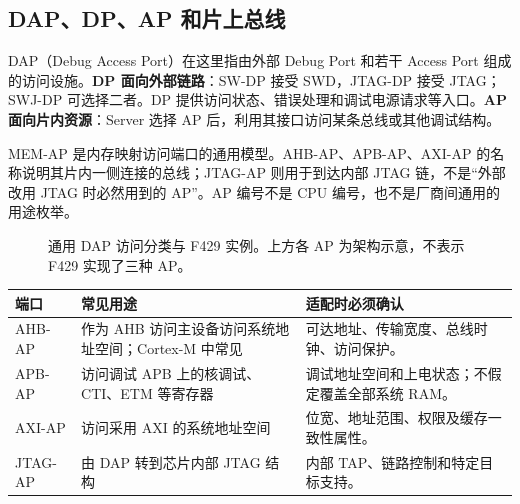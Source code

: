\documentclass[UTF8,a4paper,11pt,oneside,fontset=none]{ctexart}
\begin{document}
\subsection{DAP、DP、AP 和片上总线}
DAP（Debug Access Port）在这里指由外部 Debug Port 和若干 Access Port 组成的访问设施。\textbf{DP 面向外部链路}：SW-DP 接受 SWD，JTAG-DP 接受 JTAG；SWJ-DP 可选择二者。DP 提供访问状态、错误处理和调试电源请求等入口。\textbf{AP 面向片内资源}：Server 选择 AP 后，利用其接口访问某条总线或其他调试结构。

MEM-AP 是内存映射访问端口的通用模型。AHB-AP、APB-AP、AXI-AP 的名称说明其片内一侧连接的总线；JTAG-AP 则用于到达内部 JTAG 链，不是“外部改用 JTAG 时必然用到的 AP”。AP 编号不是 CPU 编号，也不是厂商间通用的用途枚举。

\begin{figure}[H]\centering
{}
\caption{通用 DAP 访问分类与 F429 实例。上方各 AP 为架构示意，不表示 F429 实现了三种 AP。}
\end{figure}

\noindent\begin{tabularx}{\linewidth}{@{}P{28mm}P{58mm}Y@{}}\toprule
端口 & 常见用途 & 适配时必须确认\\\midrule
AHB-AP & 作为 AHB 访问主设备访问系统地址空间；Cortex-M 中常见 & 可达地址、传输宽度、总线时钟、访问保护。\\
APB-AP & 访问调试 APB 上的核调试、CTI、ETM 等寄存器 & 调试地址空间和上电状态；不假定覆盖全部系统 RAM。\\
AXI-AP & 访问采用 AXI 的系统地址空间 & 位宽、地址范围、权限及缓存一致性属性。\\
JTAG-AP & 由 DAP 转到芯片内部 JTAG 结构 & 内部 TAP、链路控制和特定目标支持。\\\bottomrule
\end{tabularx}
\end{document}
